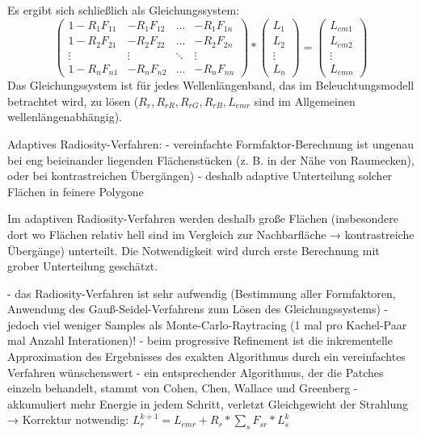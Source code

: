 \documentclass[10pt,landscape]{article}
\begin{document}
\begin{multicols}{3}
Es ergibt sich schließlich als Gleichungssystem:
$$ \begin{pmatrix} 1-R_1F_{11} & -R_1F_{12} &...& -R_1F_{1n}\\ 1-R_2F_{21} & -R_2F_{22} &...& -R_2F_{2n}\\ \vdots & \vdots & \ddots & \vdots \\ 1-R_nF_{n1} & -R_nF_{n2} &...& -R_nF_{nn} \end{pmatrix} * \begin{pmatrix} L_1\\L_2\\\vdots\\L_n \end{pmatrix} = \begin{pmatrix} L_{em1}\\L_{em2}\\\vdots\\L_{emn} \end{pmatrix}$$
Das Gleichungssystem ist für jedes Wellenlängenband, das im Beleuchtungsmodell betrachtet wird, zu lösen ($R_r, R_{rR}, R_{rG}, R_{rB}, L_{emr}$ sind im Allgemeinen wellenlängenabhängig).

Adaptives Radiosity-Verfahren:
- vereinfachte Formfaktor-Berechnung ist ungenau bei eng beieinander liegenden Flächenstücken (z. B. in der Nähe von Raumecken), oder bei kontrastreichen Übergängen)
- deshalb adaptive Unterteilung solcher Flächen in feinere Polygone

Im adaptiven Radiosity-Verfahren werden deshalb große Flächen (insbesondere dort wo Flächen relativ hell sind im Vergleich zur Nachbarfläche → kontrastreiche Übergänge) unterteilt. Die Notwendigkeit wird durch erste Berechnung mit grober Unterteilung geschätzt.

- das Radiosity-Verfahren ist sehr aufwendig (Bestimmung aller Formfaktoren, Anwendung des Gauß-Seidel-Verfahrens zum Lösen des Gleichungssystems)
- jedoch viel weniger Samples als Monte-Carlo-Raytracing (1 mal pro Kachel-Paar mal Anzahl Interationen)!
- beim progressive Refinement ist die inkrementelle Approximation des Ergebnisses des exakten Algorithmus durch ein vereinfachtes Verfahren wünschenswert
- ein entsprechender Algorithmus, der die Patches einzeln behandelt, stammt von Cohen, Chen, Wallace und Greenberg
- akkumuliert mehr Energie in jedem Schritt, verletzt Gleichgewicht der Strahlung → Korrektur notwendig:
      $L_r^{k+1}=L_{emr} + R_r*\sum_s F_{sr}* L_s^k$



\end{multicols}
\end{document}
